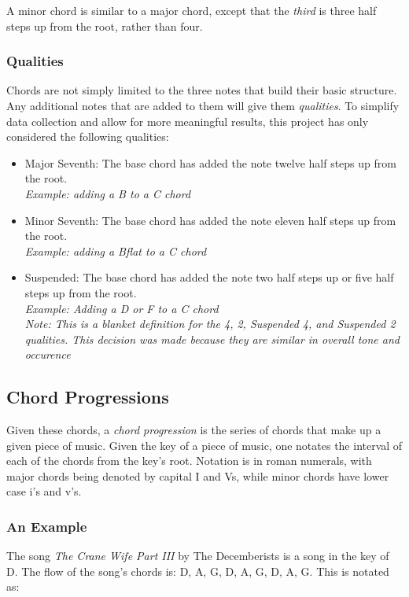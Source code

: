 \documentclass{article}
\begin{document}
		A minor chord is similar to a major chord, except that the \emph{third} 
		is three half steps up from the root, rather than four.

		\subsubsection{Qualities}
		Chords are not simply limited to the three notes that build their basic 
		structure.  Any additional notes that are added to them will give them 
		\emph{qualities}. To simplify data collection and allow for more meaningful 
		results, this project has only considered the following qualities:

		\begin{itemize}
			\item Major Seventh:  The base chord has added the note twelve half 
				steps up from the root.\\
				\emph{Example:  adding a B to a C chord}
			\item Minor Seventh:  The base chord has added the note eleven half 
				steps up from the root.\\  
				\emph{Example:  adding a Bflat to a C chord}
			\item Suspended:  The base chord has added the note two half steps 
				up or five half steps up from the root. \\  
				\emph{Example:  Adding a D or F to a C chord}\\
				\emph{Note:  This is a blanket definition 
				for the 4, 2, Suspended 4, and Suspended 2 qualities.  This decision 
				was made because they are similar in overall tone and occurence}
		\end{itemize}

	\subsection{Chord Progressions}
	Given these chords, a \emph{chord progression} is the series of chords 
	that make up a given piece of music.  Given the key of a piece of music, 
	one notates the interval of each of the chords from the key's root.  
	Notation is in roman numerals, with major chords being denoted by capital 
	I and Vs, while minor chords have lower case i's and v's.

		\subsubsection{An Example}
		The song \emph{The Crane Wife Part III} by The Decemberists is a song 
		in the key of D.  The flow of the song's chords is:  D, A, G, D, A, G, D, A, G.  
		This is notated as:\\
\end{document}
